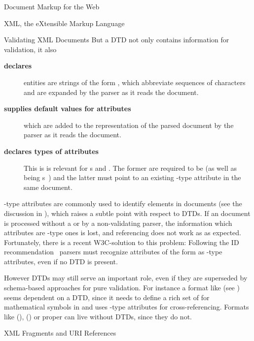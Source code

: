 \begin{omgroup}[id=markup-web]{Document Markup for the Web}
\begin{omgroup}[id=xml]{XML, the eXtensible Markup Language}
\begin{omgroup}[id=xml-validation]{Validating XML Documents}
  But a DTD not only contains information for validation, it also
  \begin{description}
  \item[{\bf{declares }}] {\xml} entities are
    strings of the form {\snippet{\&}\snippet{;}}, which abbreviate
    sequences of {\unicode} characters and are expanded by the parser as it reads the
    document.
  \item[{\bf{supplies default values for attributes}}] which are added to the
    representation of the parsed document by the parser as it reads the document.
  \item[{\bf{declares types of attributes}}] This is is relevant for
    {s} {} and {}. The former are
    required to be {} (as well as being {\xml}
    {s~\cite[section 2.3]{Bray:XML97}}) and the latter must point to
    an existing {}-type attribute in the same document.
  \end{description}
  {}-type attributes are commonly used to identify elements in {\xml}
  documents (see the discussion in {}), which raises a subtle
  point with respect to DTDs. If an {\xml} document is processed without a
  {} or by a non-validating parser, the information
  which attributes are {}-type ones is lost, and referencing does not work as
  as expected. Fortunately, there is a recent W3C-solution to this problem: Following the
  {\xml} ID recommendation~\cite{XML:id05} {\xml} parsers must recognize attributes of the
  form {} as {}-type attributes, even if no
  DTD is present.

  However DTDs may still serve an important role, even if they are superseded by
  schema-based approaches for pure validation. For instance a format like {\pmathml} (see
  {}) seems dependent on a DTD, since it needs to define a rich
  set of  for mathematical symbols in
  {\unicode} and uses {}-type attributes for cross-referencing. Formats like
  {\cmathml} ({}), {\openmath} () or
  {\omdoc} proper can live without DTDs, since they do not.
\end{omgroup}

\begin{omgroup}[id=xml-fragments]{XML Fragments and URI References}


\end{omgroup}
\end{omgroup}
\end{omgroup}
